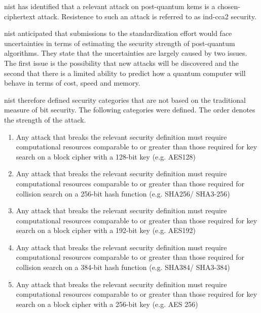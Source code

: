 \gls{nist} has identified that a relevant attack on post-quantum \glspl{kem} is a chosen-ciphertext attack. Resistence to such an attack is referred to as \gls{ind-cca2} security\cite{nist2017}. 

\gls{nist} anticipated that submissions to the standardization effort would face uncertainties in terms of estimating the security strength of post-quantum algorithms. They state that the uncertainties are largely caused by two issues. The first issue is the possibility that new attacks will be discovered and the second that there is a limited ability to predict how a quantum computer will behave in terms of cost, speed and memory\cite{nist2017}.

\gls{nist} therefore defined security categories that are not based on the traditional measure of bit security. The following categories were defined. The order denotes the strength of the attack\cite{nist2017}.

\begin{enumerate}
    \item Any attack that breaks the relevant security definition must require computational resources comparable to or greater than those required for key search on a block cipher with a 128-bit key (e.g. AES128)
    \item Any attack that breaks the relevant security definition must require computational resources comparable to or greater than those required for collision search on a 256-bit hash function (e.g. SHA256/ SHA3-256)
    \item Any attack that breaks the relevant security definition must require computational resources comparable to or greater than those required for key search on a block cipher with a 192-bit key (e.g. AES192)
    \item Any attack that breaks the relevant security definition must require computational resources comparable to or greater than those required for collision search on a 384-bit hash function (e.g. SHA384/ SHA3-384)
    \item Any attack that breaks the relevant security definition must require computational resources comparable to or greater than those required for key search on a block cipher with a 256-bit key (e.g. AES 256)
\end{enumerate}


